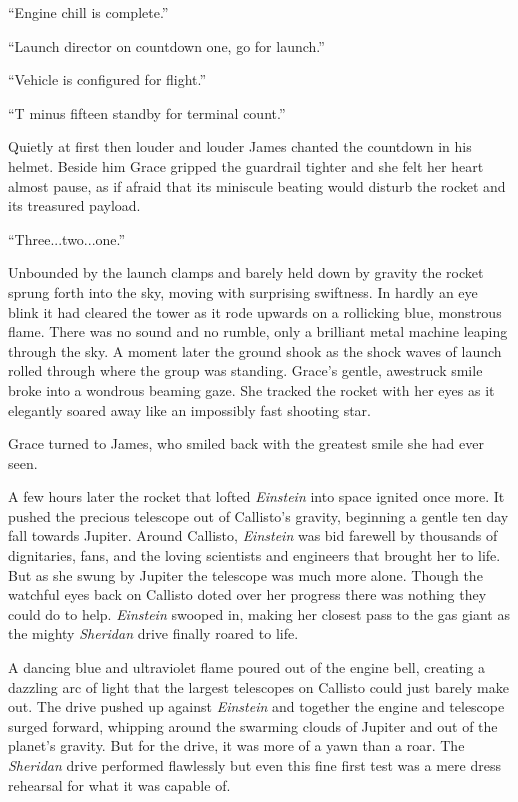 \documentclass[12pt]{article} %
\begin{document}
``Engine chill is complete.''

``Launch director on countdown one, go for launch.''

``Vehicle is configured for flight.''

``T minus fifteen standby for terminal count.''

Quietly at first then louder and louder James chanted the countdown in his helmet. Beside him Grace gripped the guardrail tighter and she felt her heart almost pause, as if afraid that its miniscule beating would disturb the rocket and its treasured payload.

``Three...two...one.''

Unbounded by the launch clamps and barely held down by gravity the rocket sprung forth into the sky, moving with surprising swiftness. In hardly an eye blink it had cleared the tower as it rode upwards on a rollicking blue, monstrous flame. There was no sound and no rumble, only a brilliant metal machine leaping through the sky. A moment later the ground shook as the shock waves of launch rolled through where the group was standing. Grace's gentle, awestruck smile broke into a wondrous beaming gaze. She tracked the rocket with her eyes as it elegantly soared away like an impossibly fast shooting star.

Grace turned to James, who smiled back with the greatest smile she had ever seen.

A few hours later the rocket that lofted \textit{Einstein} into space ignited once more. It pushed the precious telescope out of Callisto's gravity, beginning a gentle ten day fall towards Jupiter. Around Callisto, \textit{Einstein} was bid farewell by thousands of dignitaries, fans, and the loving scientists and engineers that brought her to life. But as she swung by Jupiter the telescope was much more alone. Though the watchful eyes back on Callisto doted over her progress there was nothing they could do to help. \textit{Einstein} swooped in, making her closest pass to the gas giant as the mighty \textit{Sheridan} drive finally roared to life.

A dancing blue and ultraviolet flame poured out of the engine bell, creating a dazzling arc of light that the largest telescopes on Callisto could just barely make out. The drive pushed up against \textit{Einstein} and together the engine and telescope surged forward, whipping around the swarming clouds of Jupiter and out of the planet's gravity. But for the drive, it was more of a yawn than a roar. The \textit{Sheridan} drive performed flawlessly but even this fine first test was a mere dress rehearsal for what it was capable of.
\end{document}
